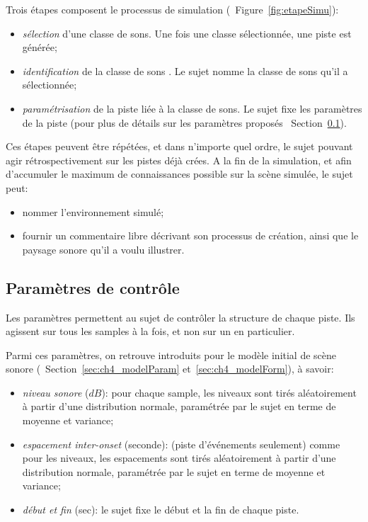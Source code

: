 Trois étapes composent le processus de simulation (\cf~Figure~\ref{fig:etapeSimu}):

\begin{itemize}
\item \emph{sélection} d'une classe de sons. Une fois une classe sélectionnée, une piste est générée; 
\item \emph{identification} de la classe de sons . Le sujet nomme la classe de sons qu'il a sélectionnée;
\item \emph{paramétrisation} de la piste liée à la classe de sons. Le sujet fixe les paramètres de la piste (pour plus de détails sur les paramètres proposés \cf~Section~\ref{sec:ch4_param}).
\end{itemize}

Ces étapes peuvent être répétées, et  dans n'importe quel ordre, le sujet pouvant agir rétrospectivement sur les pistes déjà crées. A la fin de la simulation, et afin d'accumuler le maximum de connaissances possible sur la scène simulée, le sujet peut: 

\begin{itemize}
\item nommer l'environnement simulé;
\item fournir un commentaire libre décrivant son processus de création, ainsi que le paysage sonore qu'il a voulu illustrer.
\end{itemize}



\subsection{Paramètres de contrôle}
\label{sec:ch4_param}

Les paramètres permettent au sujet de contrôler la structure de chaque piste. Ils agissent sur tous les samples à la fois, et non sur un en particulier.

Parmi ces paramètres, on retrouve   introduits pour le modèle initial de scène sonore (\cf~Section~\ref{sec:ch4_modelParam} et~\ref{sec:ch4_modelForm}), à savoir:

\begin{itemize}
\item \emph{niveau sonore} ($dB$): pour chaque sample, les niveaux sont tirés aléatoirement à partir d'une distribution normale, paramétrée par le sujet en terme de moyenne et variance;
\item \emph{espacement inter-onset} (seconde): (piste d'événements seulement) comme pour les niveaux, les espacements sont tirés aléatoirement à partir d'une distribution normale, paramétrée par le sujet en terme de moyenne et variance;
\item \emph{début et fin} (sec): le sujet fixe le début et la fin de chaque piste.
\end{itemize}

